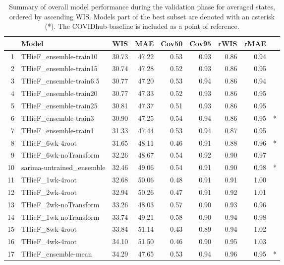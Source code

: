 \documentclass[12pt]{article}
\begin{document}
\begin{table}%
\begin{center}
\caption{Summary of overall model performance during the validation phase for averaged states, ordered by ascending WIS. Models part of the best subset are denoted with an asterisk (*). The COVIDhub-baseline is included as a point of reference.}
\label{tab:table_validation_states}
\begin{tabular}{rlrrrrrrl}
  \hline
 & Model & WIS & MAE & Cov50 & Cov95 & rWIS & rMAE &   \\ 
  \hline
1 & THieF\_ensemble-train10 & 30.73 & 47.22 & 0.53 & 0.93 & 0.86 & 0.94 &  \\ 
  2 & THieF\_ensemble-train15 & 30.74 & 47.28 & 0.52 & 0.93 & 0.86 & 0.95 &  \\ 
  3 & THieF\_ensemble-train6.5 & 30.77 & 47.20 & 0.53 & 0.94 & 0.86 & 0.94 &  \\ 
  4 & THieF\_ensemble-train20 & 30.77 & 47.33 & 0.52 & 0.93 & 0.86 & 0.95 &  \\ 
  5 & THieF\_ensemble-train25 & 30.81 & 47.37 & 0.51 & 0.93 & 0.86 & 0.95 &  \\ 
  6 & THieF\_ensemble-train3 & 30.90 & 47.25 & 0.54 & 0.94 & 0.86 & 0.95 & * \\ 
  7 & THieF\_ensemble-train1 & 31.33 & 47.44 & 0.53 & 0.94 & 0.87 & 0.95 &  \\ 
  8 & THieF\_6wk-4root & 31.65 & 48.11 & 0.46 & 0.91 & 0.88 & 0.96 & * \\ 
  9 & THieF\_6wk-noTransform & 32.26 & 48.67 & 0.54 & 0.92 & 0.90 & 0.97 &  \\ 
  10 & sarima-untrained\_ensemble & 32.46 & 49.06 & 0.54 & 0.91 & 0.90 & 0.98 & * \\ 
  11 & THieF\_1wk-4root & 32.68 & 50.06 & 0.48 & 0.91 & 0.91 & 1.00 &  \\ 
  12 & THieF\_2wk-4root & 32.94 & 50.26 & 0.47 & 0.91 & 0.92 & 1.01 &  \\ 
  13 & THieF\_2wk-noTransform & 33.26 & 48.03 & 0.57 & 0.90 & 0.93 & 0.96 &  \\ 
  14 & THieF\_1wk-noTransform & 33.74 & 49.21 & 0.58 & 0.90 & 0.94 & 0.98 &  \\ 
  15 & THieF\_8wk-4root & 33.84 & 51.14 & 0.43 & 0.89 & 0.94 & 1.02 &  \\ 
  16 & THieF\_4wk-4root & 34.10 & 51.50 & 0.46 & 0.90 & 0.95 & 1.03 &  \\ 
  17 & THieF\_ensemble-mean & 34.29 & 47.65 & 0.53 & 0.94 & 0.96 & 0.95 & * \\ 

\end{tabular}
\end{center}
\end{table}
\end{document}
